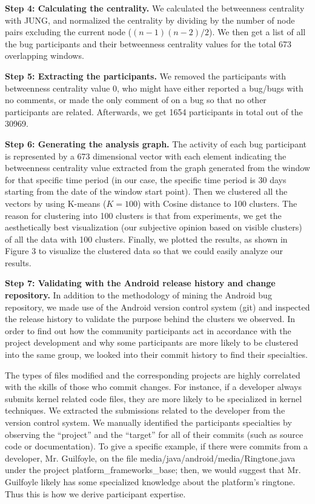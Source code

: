 \documentclass[10pt, conference, compsocconf]{IEEEtran}
\begin{document}
\textbf{Step 4: Calculating the centrality.} We calculated the
betweenness centrality with JUNG, and normalized the centrality by
dividing by the number of node pairs excluding the current node
($(n-1)(n-2)/2$). We then get a list of all the bug participants and
their betweenness centrality values for the total 673 overlapping
windows.


\textbf{Step 5: Extracting the participants.} We removed the
participants with betweenness centrality value 0, who might have
either reported a bug/bugs with no comments, or made the only comment
of on a bug so that no other participants are related. Afterwards, we get
1654 participants in total out of the 30969.


\textbf{Step 6: Generating the analysis graph.} The activity
of each bug participant is represented by a 673 dimensional vector with
each element indicating the betweenness centrality value extracted
from the graph generated from the window for that
specific time period (in our case, the specific time period is 30 days
starting from the date of the window start point). Then we clustered
all the vectors by using K-means ($K=100$) with Cosine distance to 100
clusters. The reason for clustering into 100 clusters is that from
experiments, we get the aesthetically best visualization (our
subjective opinion based on visible clusters) of all the data with 100
clusters. Finally, we plotted the results, as shown in Figure 3 to
visualize the clustered data so that we could easily analyze
our results.


\textbf{Step 7: Validating with the Android release history and change
  repository.} In addition to the methodology of mining the Android
bug repository, we made use of the Android version control system
(git) and
inspected the release history to validate the purpose behind the
clusters we observed.
In order to find out how the community participants
act in accordance with the project development and why some
participants are more likely to be clustered into the same group, we
looked into their commit history to find their specialties.


The types of files modified and the corresponding projects are highly
correlated with the skills of those who commit changes. For
instance, if a developer always submits kernel related code
files, they are more likely to be specialized in kernel techniques. We
extracted the submissions related to the developer from the version
control system.
We manually identified the participants specialties by
observing the ``project'' and the
``target'' for all of their commits (such as source code or
documentation).
To give a specific example, if there were commits from a developer,
Mr. Guilfoyle, on the file
media/java/android/media/Ringtone.java under the project
platform\_frameworks\_base; then, we would suggest that Mr. Guilfoyle 
likely has some specialized knowledge about the platform's ringtone. 
Thus this is how we derive participant expertise.
\end{document}

